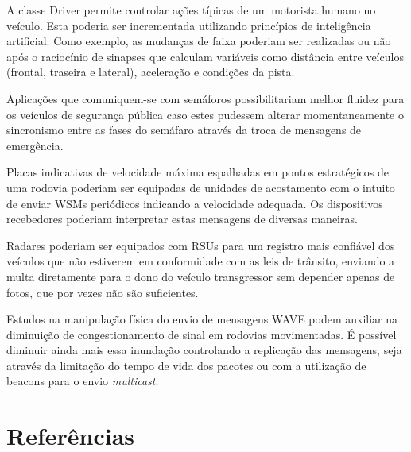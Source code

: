 \documentclass[
12pt,				%
openright,			%
oneside,			%
a4paper,			%
brazil,				%
]{abntex2}
\begin{document}
{	\par A classe Driver permite controlar ações típicas de um motorista humano no veículo. Esta poderia ser incrementada utilizando princípios de inteligência artificial. Como exemplo, as mudanças de faixa poderiam ser realizadas ou não após o raciocínio de sinapses que calculam variáveis como distância entre veículos (frontal, traseira e lateral), aceleração e condições da pista.

	\par Aplicações que comuniquem-se com semáforos possibilitariam melhor fluidez para os veículos de segurança pública caso estes pudessem alterar momentaneamente o sincronismo entre as fases do semáfaro através da troca de mensagens de emergência.

	\par Placas indicativas de velocidade máxima espalhadas em pontos estratégicos de uma rodovia poderiam ser equipadas de unidades de acostamento com o intuito de enviar WSMs periódicos indicando a velocidade adequada. Os dispositivos recebedores poderiam interpretar estas mensagens de diversas maneiras.

	\par Radares poderiam ser equipados com RSUs para um registro mais confiável dos veículos que não estiverem em conformidade com as leis de trânsito, enviando a multa diretamente para o dono do veículo transgressor sem depender apenas de fotos, que por vezes não são suficientes.

	\par Estudos na manipulação física do envio de mensagens WAVE podem auxiliar na diminuição de congestionamento de sinal em rodovias movimentadas. É possível diminuir ainda mais essa inundação controlando a replicação das mensagens, seja através da limitação do tempo de vida dos pacotes ou com a utilização de beacons para o envio \textit{multicast}.

	\postextual


	\newpage
	\chapter*[Referências]{Referências}
	\flushleft

}
\end{document}
